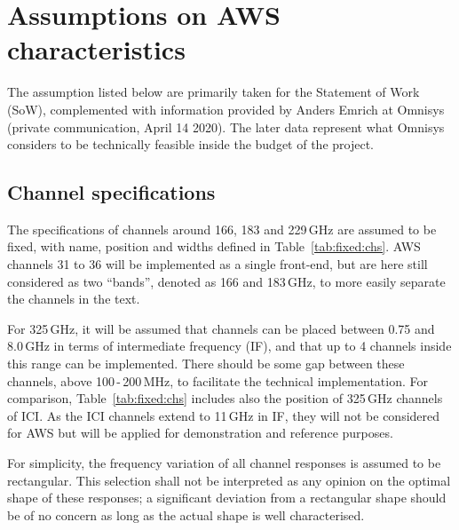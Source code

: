 \documentclass[12pt]{article}
\begin{document}
\section{Assumptions on AWS characteristics}
%
The assumption listed below are primarily taken for the Statement of Work
(SoW), complemented with information provided by Anders Emrich at Omnisys
(private communication, April 14 2020). The later data represent what Omnisys
considers to be technically feasible inside the budget of the project.

\subsection{Channel specifications}
%
The specifications of channels around 166, 183 and 229\,GHz are assumed to
be fixed, with name, position and widths defined in Table~\ref{tab:fixed:chs}.
AWS channels 31 to 36 will be implemented as a single front-end, but are here
still considered as two ``bands'', denoted as 166 and 183\,GHz, to more easily
separate the channels in the text. 

For 325\,GHz, it will be assumed that channels can be placed between 0.75 and
8.0\,GHz in terms of intermediate frequency (IF), and that up to 4 channels
inside this range can be implemented. There should be some gap between these
channels, above 100\,-\,200\,MHz, to facilitate the technical implementation.
For comparison, Table~\ref{tab:fixed:chs} includes also the position of 
325\,GHz channels of ICI. As the ICI channels extend to 11\,GHz in IF, they will not
be considered for AWS but will be applied for demonstration and reference
purposes.

For simplicity, the frequency variation of all channel responses is assumed to
be rectangular. This selection shall not be interpreted as any opinion on the
optimal shape of these responses; a significant deviation from a rectangular
shape should be of no concern as long as the actual shape is well
characterised.
\end{document}
